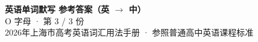 \documentclass[10pt,a4paper]{article}
\begin{document}
\pagestyle{plain}

\begin{center}
{\LARGE\bfseries 英语单词默写 \quad 参考答案（英 $\to$ 中）}\\[0.22em]
{\large O 字母 · 第 3 / 3 份}\\[0.18em]
{\small 2026年上海市高考英语词汇用法手册 · 参照普通高中英语课程标准}
\end{center}

\vspace{0.2em}
\noindent{\color{rulegray}\rule{\textwidth}{0.8pt}}

\vspace{0.35em}

\vspace{0.25em}
\renewcommand{\arraystretch}{1.32}
\end{document}
